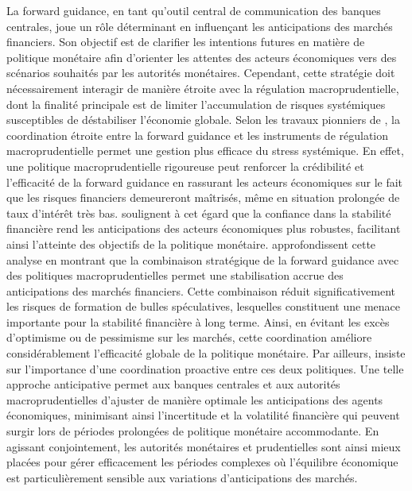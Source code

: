 La forward guidance, en tant qu'outil central de communication des banques centrales, joue un rôle déterminant en influençant les anticipations des marchés financiers. Son objectif est de clarifier les intentions futures en matière de politique monétaire afin d’orienter les attentes des acteurs économiques vers des scénarios souhaités par les autorités monétaires. Cependant, cette stratégie doit nécessairement interagir de manière étroite avec la régulation macroprudentielle, dont la finalité principale est de limiter l'accumulation de risques systémiques susceptibles de déstabiliser l'économie globale. Selon les travaux pionniers de \citep{BorioZhu2012}, la coordination étroite entre la forward guidance et les instruments de régulation macroprudentielle permet une gestion plus efficace du stress systémique. En effet, une politique macroprudentielle rigoureuse peut renforcer la crédibilité et l'efficacité de la forward guidance en rassurant les acteurs économiques sur le fait que les risques financiers demeureront maîtrisés, même en situation prolongée de taux d'intérêt très bas. \citep{FilardoHofmann2014} soulignent à cet égard que la confiance dans la stabilité financière rend les anticipations des acteurs économiques plus robustes, facilitant ainsi l'atteinte des objectifs de la politique monétaire. \citep{GalatiMoessner2018} approfondissent cette analyse en montrant que la combinaison stratégique de la forward guidance avec des politiques macroprudentielles permet une stabilisation accrue des anticipations des marchés financiers. Cette combinaison réduit significativement les risques de formation de bulles spéculatives, lesquelles constituent une menace importante pour la stabilité financière à long terme. Ainsi, en évitant les excès d'optimisme ou de pessimisme sur les marchés, cette coordination améliore considérablement l'efficacité globale de la politique monétaire. Par ailleurs, \citep{Smets2014} insiste sur l'importance d'une coordination proactive entre ces deux politiques. Une telle approche anticipative permet aux banques centrales et aux autorités macroprudentielles d’ajuster de manière optimale les anticipations des agents économiques, minimisant ainsi l'incertitude et la volatilité financière qui peuvent surgir lors de périodes prolongées de politique monétaire accommodante. En agissant conjointement, les autorités monétaires et prudentielles sont ainsi mieux placées pour gérer efficacement les périodes complexes où l’équilibre économique est particulièrement sensible aux variations d’anticipations des marchés.

